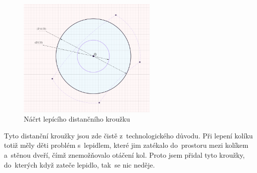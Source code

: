 \begin{figure}[h]
	\centering
    \includegraphics[width=0.6\textwidth]{kapitoly/obrazky/M3/lepici_distance.png}
    \caption{Náčrt lepícího distančního kroužku}
    \label{fig:M3-lepici-distance}
\end{figure}

Tyto distanční kroužky jsou zde čistě z~technologického důvodu. Při lepení kolíku totiž měly děti problém s~lepidlem, které jim zatékalo do~prostoru mezi kolíkem 
a~stěnou dveří, čímž znemožňovalo otáčení kol. Proto jsem přidal tyto kroužky, do~kterých když zateče lepidlo, tak~se nic neděje.

\newpage
\clearpage